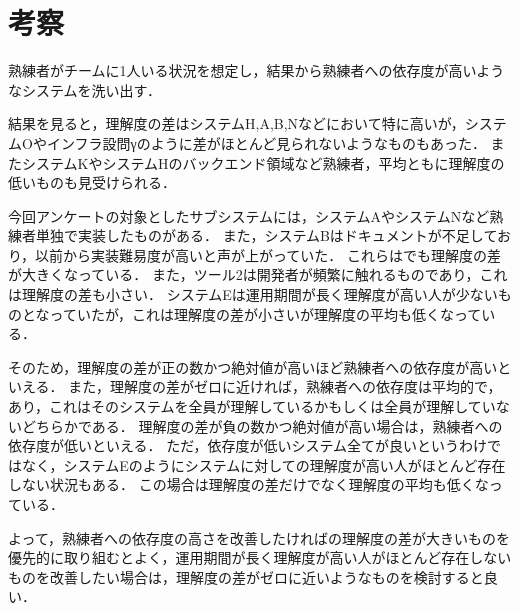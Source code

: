\section{考察}
熟練者がチームに1人いる状況を想定し，結果から熟練者への依存度が高いようなシステムを洗い出す．

結果を見ると，理解度の差はシステムH,A,B,Nなどにおいて特に高いが，システムOやインフラ設問γのように差がほとんど見られないようなものもあった．
またシステムKやシステムHのバックエンド領域など熟練者，平均ともに理解度の低いものも見受けられる．

今回アンケートの対象としたサブシステムには，システムAやシステムNなど熟練者単独で実装したものがある．
また，システムBはドキュメントが不足しており，以前から実装難易度が高いと声が上がっていた．
これらはでも理解度の差が大きくなっている．
また，ツール2は開発者が頻繁に触れるものであり，これは理解度の差も小さい．
システムEは運用期間が長く理解度が高い人が少ないものとなっていたが，これは理解度の差が小さいが理解度の平均も低くなっている．

そのため，理解度の差が正の数かつ絶対値が高いほど熟練者への依存度が高いといえる．
また，理解度の差がゼロに近ければ，熟練者への依存度は平均的で，あり，これはそのシステムを全員が理解しているかもしくは全員が理解していないどちらかである．
理解度の差が負の数かつ絶対値が高い場合は，熟練者への依存度が低いといえる．
ただ，依存度が低いシステム全てが良いというわけではなく，システムEのようにシステムに対しての理解度が高い人がほとんど存在しない状況もある．
この場合は理解度の差だけでなく理解度の平均も低くなっている．

よって，熟練者への依存度の高さを改善したければの理解度の差が大きいものを優先的に取り組むとよく，運用期間が長く理解度が高い人がほとんど存在しないものを改善したい場合は，理解度の差がゼロに近いようなものを検討すると良い．
